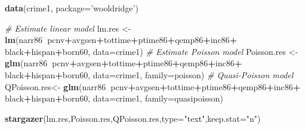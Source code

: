 \documentclass[]{book}
\newenvironment{Shaded}{\begin{snugshade}}{\end{snugshade}}
\newcommand{\CommentTok}[1]{\textcolor[rgb]{0.56,0.35,0.01}{\textit{#1}}}
\newcommand{\DataTypeTok}[1]{\textcolor[rgb]{0.13,0.29,0.53}{#1}}
\newcommand{\KeywordTok}[1]{\textcolor[rgb]{0.13,0.29,0.53}{\textbf{#1}}}
\newcommand{\NormalTok}[1]{#1}
\newcommand{\OperatorTok}[1]{\textcolor[rgb]{0.81,0.36,0.00}{\textbf{#1}}}
\newcommand{\StringTok}[1]{\textcolor[rgb]{0.31,0.60,0.02}{#1}}
\begin{document}
\begin{Shaded}
\begin{Highlighting}[]
\KeywordTok{data}\NormalTok{(crime1, }\DataTypeTok{package=}\StringTok{'wooldridge'}\NormalTok{)}

\CommentTok{# Estimate linear model}
\NormalTok{lm.res      <-}\StringTok{  }\KeywordTok{lm}\NormalTok{(narr86}\OperatorTok{~}\NormalTok{pcnv}\OperatorTok{+}\NormalTok{avgsen}\OperatorTok{+}\NormalTok{tottime}\OperatorTok{+}\NormalTok{ptime86}\OperatorTok{+}\NormalTok{qemp86}\OperatorTok{+}\NormalTok{inc86}\OperatorTok{+}
\StringTok{                     }\NormalTok{black}\OperatorTok{+}\NormalTok{hispan}\OperatorTok{+}\NormalTok{born60, }\DataTypeTok{data=}\NormalTok{crime1)}
\CommentTok{# Estimate Poisson model}
\NormalTok{Poisson.res <-}\StringTok{ }\KeywordTok{glm}\NormalTok{(narr86}\OperatorTok{~}\NormalTok{pcnv}\OperatorTok{+}\NormalTok{avgsen}\OperatorTok{+}\NormalTok{tottime}\OperatorTok{+}\NormalTok{ptime86}\OperatorTok{+}\NormalTok{qemp86}\OperatorTok{+}\NormalTok{inc86}\OperatorTok{+}
\StringTok{                     }\NormalTok{black}\OperatorTok{+}\NormalTok{hispan}\OperatorTok{+}\NormalTok{born60, }\DataTypeTok{data=}\NormalTok{crime1, }\DataTypeTok{family=}\NormalTok{poisson)}
\CommentTok{# Quasi-Poisson model}
\NormalTok{QPoisson.res<-}\StringTok{ }\KeywordTok{glm}\NormalTok{(narr86}\OperatorTok{~}\NormalTok{pcnv}\OperatorTok{+}\NormalTok{avgsen}\OperatorTok{+}\NormalTok{tottime}\OperatorTok{+}\NormalTok{ptime86}\OperatorTok{+}\NormalTok{qemp86}\OperatorTok{+}\NormalTok{inc86}\OperatorTok{+}
\StringTok{                     }\NormalTok{black}\OperatorTok{+}\NormalTok{hispan}\OperatorTok{+}\NormalTok{born60, }\DataTypeTok{data=}\NormalTok{crime1, }\DataTypeTok{family=}\NormalTok{quasipoisson)}
\end{Highlighting}
\end{Shaded}

\begin{Shaded}
\begin{Highlighting}[]
\KeywordTok{stargazer}\NormalTok{(lm.res,Poisson.res,QPoisson.res,}\DataTypeTok{type=}\StringTok{"text"}\NormalTok{,}\DataTypeTok{keep.stat=}\StringTok{"n"}\NormalTok{)}
\end{Highlighting}
\end{Shaded}
\end{document}
